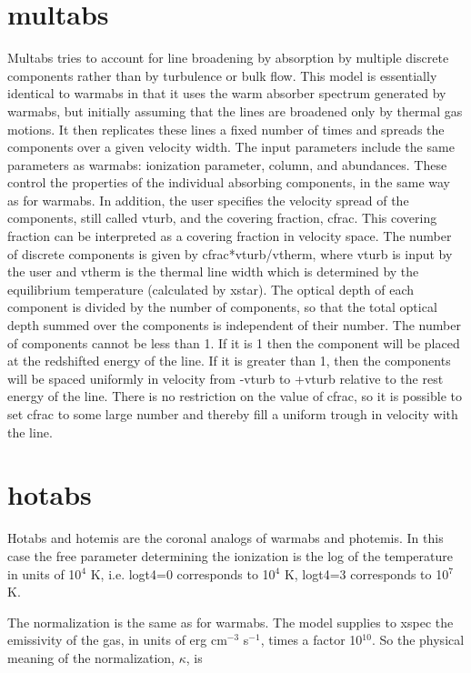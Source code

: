 \section{multabs}

Multabs tries to account for line broadening by absorption by multiple discrete components 
rather than by turbulence or bulk flow.  This model is essentially identical 
to warmabs in that it uses the warm absorber spectrum generated by warmabs, but 
initially assuming that the lines are broadened only by thermal gas motions. 
It then replicates these lines a fixed number of times and spreads the components 
over a given velocity width.  The input parameters include the same parameters 
as  warmabs:  ionization parameter, column, and abundances.  These control the properties
of the individual absorbing components, in the same way as for warmabs.
In addition, the user specifies the velocity spread of the components, still called 
vturb, and the covering fraction, cfrac.  This covering fraction 
can be interpreted as a covering fraction in velocity space.  
The number of discrete components is given by cfrac*vturb/vtherm,
where vturb is input by the user and vtherm is the thermal line width which 
is determined by the equilibrium temperature (calculated by xstar).  The 
optical depth of each component is divided by the number of components, so that the 
total optical depth summed over the components is independent of their number.
The number of components cannot be less than 1. If it is 1 then the component will 
be placed at the redshifted energy of the line.  If it is greater than 1, then the 
components will be spaced uniformly  in velocity from -vturb to +vturb relative 
to the rest energy of the line.  There is no restriction on the value of cfrac, 
so it is possible to set cfrac to some large number and thereby fill a uniform 
trough in velocity with the line.

\section{hotabs}

Hotabs and hotemis are the coronal analogs of warmabs and photemis.  In this 
case the free parameter determining the ionization is the log of the temperature
in units of 10$^4$ K, i.e. logt4=0 corresponds to 10$^4$ K, logt4=3 corresponds to 10$^7$K.


The normalization is the same as for warmabs. 
The model supplies to xspec the emissivity of the gas, in units of 
erg cm$^{-3}$ s$^{-1}$, times a factor 10$^{10}$.  So the physical meaning of the 
normalization, $\kappa$, is

